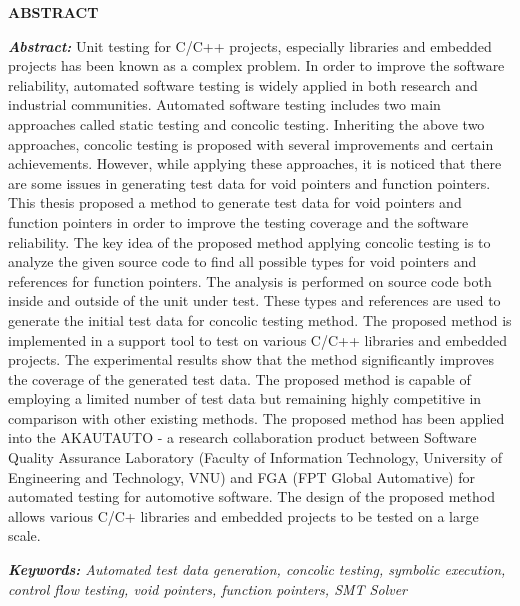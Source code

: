 \newpage
{}
\begin{center}
    \textbf{ABSTRACT}
\end{center}
\changefontsizes[16pt]{12pt}
\textit{\textbf{Abstract: }} 
Unit testing for C/C++ projects, especially libraries and embedded projects has been known as a complex problem. In order to improve the software reliability, automated software testing is widely applied in both research and industrial communities. Automated software testing includes two main approaches called static testing and concolic testing. Inheriting the above two approaches, concolic testing is proposed with several improvements and certain achievements. However, while applying these approaches, it is noticed that there are some issues in generating test data for void pointers and function pointers. This thesis proposed a method to generate test data for void pointers and function pointers in order to improve the testing coverage and the software reliability. The key idea of the proposed method applying concolic testing is to analyze the given source code to find all possible types for void pointers and references for function pointers. The analysis is performed on source code both inside and outside of the unit under test. These types and references are used to generate the initial test data for concolic testing method. The proposed method is implemented in a support tool to test on various C/C++ libraries and embedded projects. The experimental results show that the method significantly improves the coverage of the generated test data. The proposed method is capable of employing a limited number of test data but remaining highly competitive in comparison with other existing methods. The proposed method has been applied into the AKAUTAUTO - a research collaboration product between Software Quality Assurance Laboratory (Faculty of Information Technology, University of Engineering and Technology, VNU) and FGA (FPT Global Automative) for automated testing for automotive software. The design of the proposed method allows various C/C+ libraries and embedded projects to be tested on a large scale.

\vspace{-0.5cm}
\begin{flushleft}
  \textit{\textbf{Keywords: } Automated test data generation, concolic testing, symbolic execution, control flow testing, void pointers, function pointers, SMT Solver}
\end{flushleft}
\changefontsizes[16pt]{13pt}
